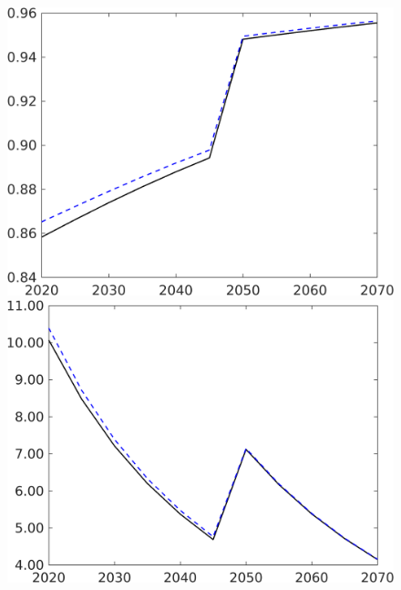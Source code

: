 \begin{figure}[h!!!]
\begin{minipage}[]{0.32\textwidth}
	\end{minipage}
	\begin{minipage}[]{0.32\textwidth}
		\includegraphics[width=1\textwidth]{../../codding_model/own_basedOnFried/optimalPol_190722_tidiedUp/figures/all_10Aout22/comp_benchregime3_notaul2_OPT_T_NoTaus_tauf_spillover0_noskill0_sep1_xgrowth0_PV1_etaa0.79_lgd0.png}
	\end{minipage}
	\begin{minipage}[]{0.32\textwidth}
		\includegraphics[width=1\textwidth]{../../codding_model/own_basedOnFried/optimalPol_190722_tidiedUp/figures/all_10Aout22/S_PercentageLfDynNT_noeff_Target_regime3_spillover0_noskill0_sep1_xgrowth0_PV1_etaa0.79_lgd0.png}

\end{minipage}
\end{figure}
